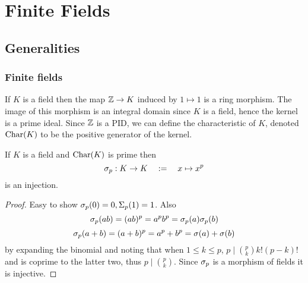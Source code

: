 \chapter{Finite Fields}
\section{Generalities}
\subsection{Finite fields}
\begin{dfn}
    If $K$ is a field then the map $\mathbb{Z} \to K$ induced by $1 \mapsto 1$
    is a ring morphism.
    The image of this morphism is an integral domain since $K$ is a field,
    hence the kernel is a prime ideal. 
    Since $\mathbb{Z}$ is a PID, 
    we can define the characteristic of $K$, denoted
    $\mathrm{Char}(K)$ to be the positive generator of the kernel.
\end{dfn}

\begin{prop}
    If $K$ is a field and $\mathrm{Char}(K)$ is prime then 
    \[\sigma_p : K \to K \quad := \quad x \mapsto x^p\]
    is an injection.
\end{prop}
\begin{proof}
    Easy to show $\sigma_p(0) = 0, \Sigma_p (1) = 1$. 
    Also
    \[\sigma_p (ab) = (ab)^p = a^p b^p = \sigma_p(a) \sigma_p(b)\]
    \[\sigma_p (a +b) = (a + b)^p = a^p + b^p = \sigma(a) + \sigma(b)\]
    by expanding the binomial and noting that when $1 \le k \le p$, 
    $ p \mid \binom{p}{k} k! (p-k)!$ and is coprime to the latter two,
    thus $p \mid \binom{p}{k}$.
    Since $\sigma_p$ is a morphism of fields it is injective.
\end{proof}

